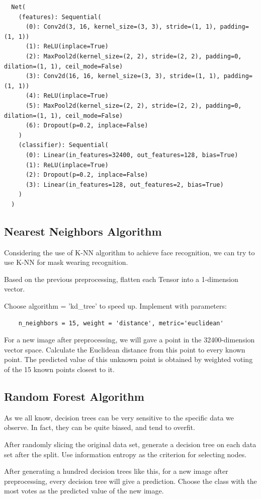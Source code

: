\documentclass{article}
\begin{document}
  \begin{lstlisting}
  Net(
    (features): Sequential(
      (0): Conv2d(3, 16, kernel_size=(3, 3), stride=(1, 1), padding=(1, 1))
      (1): ReLU(inplace=True)
      (2): MaxPool2d(kernel_size=(2, 2), stride=(2, 2), padding=0, dilation=(1, 1), ceil_mode=False)
      (3): Conv2d(16, 16, kernel_size=(3, 3), stride=(1, 1), padding=(1, 1))
      (4): ReLU(inplace=True)
      (5): MaxPool2d(kernel_size=(2, 2), stride=(2, 2), padding=0, dilation=(1, 1), ceil_mode=False)
      (6): Dropout(p=0.2, inplace=False)
    )
    (classifier): Sequential(
      (0): Linear(in_features=32400, out_features=128, bias=True)
      (1): ReLU(inplace=True)
      (2): Dropout(p=0.2, inplace=False)
      (3): Linear(in_features=128, out_features=2, bias=True)
    )
  )
  \end{lstlisting}

  \subsection{Nearest Neighbors Algorithm}
  Considering the use of K-NN algorithm to achieve face recognition, we can try to use K-NN for mask wearing recognition.

  Based on the previous preprocessing, flatten each Tensor into a 1-dimension vector.

  Choose algorithm = 'kd\_tree' to speed up. Implement with parameters:\begin{lstlisting}
    n_neighbors = 15, weight = 'distance', metric='euclidean'
  \end{lstlisting}
  For a new image after preprocessing, we will gave a point in the 32400-dimension vector space. Calculate the Euclidean distance from this point to every known point. The predicted value of this unknown point is obtained by weighted voting of the 15 known points closest to it.

  \subsection{Random Forest Algorithm}
  As we all know, decision trees can be very sensitive to the specific data we observe. In fact, they can be quite biased, and tend to overfit.

  After randomly slicing the original data set, generate a decision tree on each data set after the split. Use information entropy as the criterion for selecting nodes.

  After generating a hundred decision trees like this, for a new image after preprocessing, every decision tree will give a prediction. Choose the class with the most votes as the predicted value of the new image.
\end{document}
